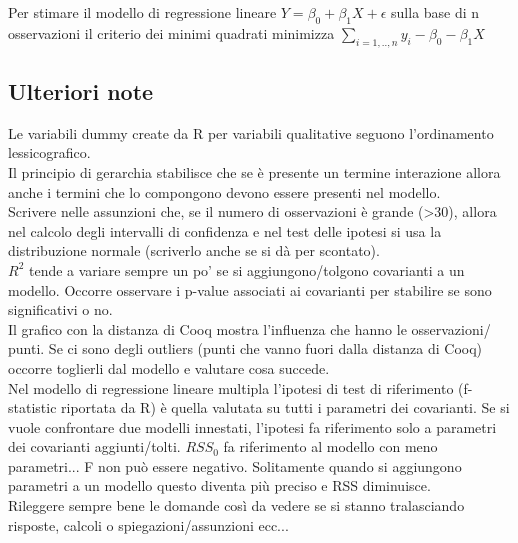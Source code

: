 Per stimare il modello di regressione lineare $Y = \beta_0 + \beta_1X + \epsilon$ sulla
base di n osservazioni il criterio dei minimi quadrati minimizza
$\sum_{i=1,..,n} y_i - \beta_0 - \beta_1X$

\subsection{Ulteriori note}

Le variabili dummy create da R per variabili qualitative seguono
l'ordinamento lessicografico.\\

Il principio di gerarchia stabilisce che se è presente un termine
interazione allora anche i termini che lo compongono devono essere presenti
nel modello.\\

Scrivere nelle assunzioni che, se il numero di osservazioni è grande (>30),
allora nel calcolo degli intervalli di confidenza e nel test delle ipotesi
si usa la distribuzione normale (scriverlo anche se si dà per scontato).\\

$R^2$ tende a variare sempre un po' se si aggiungono/tolgono covarianti a un
modello. Occorre osservare i p-value associati ai covarianti per stabilire se
sono significativi o no.\\

Il grafico con la distanza di Cooq mostra l'influenza che hanno le osservazioni/
punti. Se ci sono degli outliers (punti che vanno fuori dalla distanza di Cooq)
occorre toglierli dal modello e valutare cosa succede.\\

Nel modello di regressione lineare multipla l'ipotesi di test di riferimento
(f-statistic riportata da R) è quella valutata su tutti i parametri dei
covarianti. Se si vuole confrontare due modelli innestati, l'ipotesi fa riferimento
solo a parametri dei covarianti aggiunti/tolti. $RSS_0$ fa riferimento al modello
con meno parametri... F non può essere negativo. Solitamente quando si aggiungono
parametri a un modello questo diventa più preciso e RSS diminuisce.\\

Rileggere sempre bene le domande così da vedere se si stanno tralasciando 
risposte, calcoli o spiegazioni/assunzioni ecc...
